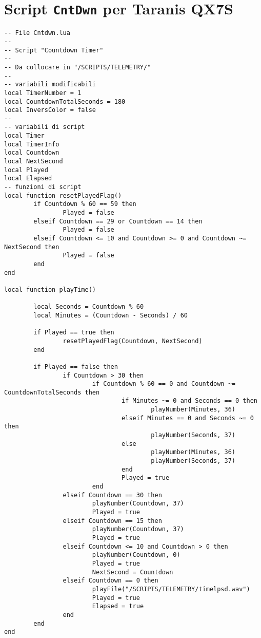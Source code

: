 \section*{Script \texttt{CntDwn} per Taranis QX7S}
\begin{lstlisting}
-- File Cntdwn.lua
--
-- Script "Countdown Timer"
--
-- Da collocare in "/SCRIPTS/TELEMETRY/"
--
-- variabili modificabili
local TimerNumber = 1
local CountdownTotalSeconds = 180
local InversColor = false
--
-- variabili di script
local Timer
local TimerInfo
local Countdown         
local NextSecond        
local Played            
local Elapsed           
-- funzioni di script
local function resetPlayedFlag()
        if Countdown % 60 == 59 then
                Played = false
        elseif Countdown == 29 or Countdown == 14 then
                Played = false
        elseif Countdown <= 10 and Countdown >= 0 and Countdown ~= NextSecond then
                Played = false
        end
end

local function playTime()

        local Seconds = Countdown % 60 
        local Minutes = (Countdown - Seconds) / 60

        if Played == true then
                resetPlayedFlag(Countdown, NextSecond)
        end

        if Played == false then
                if Countdown > 30 then
                        if Countdown % 60 == 0 and Countdown ~= CountdownTotalSeconds then
                                if Minutes ~= 0 and Seconds == 0 then
                                        playNumber(Minutes, 36)
                                elseif Minutes == 0 and Seconds ~= 0 then
                                        playNumber(Seconds, 37)
                                else
                                        playNumber(Minutes, 36)
                                        playNumber(Seconds, 37)
                                end
                                Played = true
                        end
                elseif Countdown == 30 then
                        playNumber(Countdown, 37)
                        Played = true
                elseif Countdown == 15 then
                        playNumber(Countdown, 37)
                        Played = true
                elseif Countdown <= 10 and Countdown > 0 then
                        playNumber(Countdown, 0)
                        Played = true
                        NextSecond = Countdown
                elseif Countdown == 0 then
                        playFile("/SCRIPTS/TELEMETRY/timelpsd.wav")
                        Played = true
                        Elapsed = true
                end
        end
end


\end{lstlisting}
